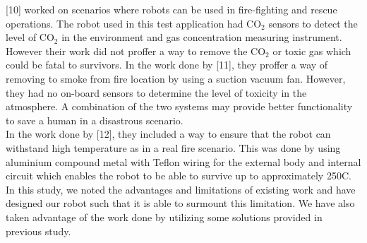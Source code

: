 [10] worked on scenarios where robots can be used in fire-fighting and rescue operations. The robot used in this test application had $\mathrm{CO_2}$ sensors to detect the level of $\mathrm{CO_2}$ in the environment and gas concentration measuring instrument. However their work did not proffer a way to remove the $\mathrm{CO_2}$ or toxic gas which could be fatal to survivors. In the work done by [11], they proffer a way of removing to smoke from fire location by using a suction vacuum fan. However, they had no on-board sensors to determine the level of toxicity in the atmosphere. A combination of the two systems may provide better functionality to save a human in a disastrous scenario.\\

In the work done by [12], they included a way to ensure that the robot can withstand high temperature as in a real fire scenario. This was done by using aluminium compound metal with Teflon wiring for the external body and internal circuit which enables the robot to be able to survive up to approximately 250\degree C.\\

In this study, we noted the advantages and  limitations of existing work and have designed our robot such that it is able to surmount this limitation. We have also taken advantage of the work done by utilizing some solutions provided in previous study.\\












